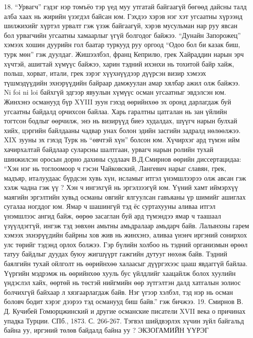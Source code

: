 18. “Урвагч” гэдэг нэр томъёо тэр үед муу утгатай байгаагүй бөгөөд дайсны талд алба хаах нь жирийн үзэгдэл байсан юм. Гэхдээ хэрэв нэг хэт угсаатны хүрээнд шилжихийг хүртэл урвалт гэж үзэж байгаагүй, хэрэв мусульман нар руу явсан бол урвагчийн угсаатны хамаарлыг үгүй болгодог байжээ. “Дунайн Запорожец” хэмээх хошин дуурийн гол баатар туркууд руу оргоод “Одоо бол би казак биш, турк мөн” гэж дуулдаг.
Жишээлбэл, франц Кеприлю, грек Хайраддин нарын эрч хүчтэй, ашигтай хүмүүс байжээ, харин тэдний ихэнхи нь тохитой байр хайж, польш, хорват, итали, грек зэрэг хүүхнүүдээр дүүрсэн визир хэмээх түшмэдүүдийн эхнэрүүдийн байраар дамжуулан амар хялбар ажил олж байжээ. Ni foi ni loi байхгүй эдгээр явуулын хүмүүс осман угсаатныг эвдэлсэн юм. Жинхэнэ османууд бүр XYIII зуун гэхэд өөрийнхөө эх оронд дарлагдаж буй угсаатны байдалд орчихсон байлаа. Харь гаралтны цатгалан нь зан үйлийн тогтсон бодлыг өөрчилж, энэ нь визирүүд биеэ худалдах, шүүгч нарын булхай хийх, цэргийн байлдааны чадвар унах болон эдийн засгийн задралд нөлөөлжээ. XIX зууны эх гэхэд Турк нь “өвчтэй хүн” болсон юм. Хүчирхэг ард түмэн ийм хачирхалтай байдлаар суларсны шалтгаан, урвагч нарын ролийн тухай шинжилсэн оросын дорно дахины судлаач В.Д.Смирнов өөрийн диссертацидаа: “Хэн нэг нь тоглоомоор ч гэсэн Чайковский, Лангевич нарыг славян, грек, мадъяр, италуудаас бүрдсэн хувь хүн, исламыг итгэл үнэмшлээрээ олж авсан гэж хэлж чадна гэж үү ? Хэн ч ингэхгүй нь эргэлзээгүй юм. Үүний хамт иймэрхүү маягийн эргэлтийн хувьд османы овгийг ялгуулсан гавъяаны үр шимийг ашиглах сугалаа ногддог юм. Ямар ч шашингүй тэд ёс суртахууны аливаа итгэл үнэмшлээс ангид байж, өөрөө засаглан буй ард түмэндээ ямар ч таашаал үзүүлдэггүй, ингэж тэд зөвхөн амьтны амьдралаар амьдарч байв. Лалынхны гарем хэмээх эхнэрүүдийн байрны хов жив нь жинхэнэ, аливаа үнэнч иргэний сонирхох улс төрийг тэдэнд орлох болжээ. Гэр бүлийн холбоо нь тэдний организмын өрөөл татуу байдлыг дуудах буюу жигшүүрт гажгийн дутууг нөхөж байв. Тэдний баялгийн тухай ойлголт нь өөрийнхөө халаасыг дүүргэхээс цааш явдаггүй байлаа. Үүргийн мэдрэмж нь өөрийнхөө хууль бус үйлдлийг хаацайлж болох хуулийн үндэслэл хайх, өөртөй нь төстэй нийгмийн өөр зүтгэлтэн далд хатгалын золиос болчихгүй байхаар л хязгаарлагдаж байв. Нэг үгээр хэлбэл, тэд нэр нь осман боловч бодит хэрэг дээрээ тэд османууд биш байв.” гэж бичжээ. 19. Смирнов В. Д. Кучибей Гомюрцжинский и другие османские писатели XVII века о причинах упадка Турции. СПб., 1873. С. 266-267. Тэгвэл шийдвэрлэх хүчин зүйл байгальд байна уу, иргэний төлөв байдалд байна уу ?
ЭКЗОГАМИЙН ҮҮРЭГ
